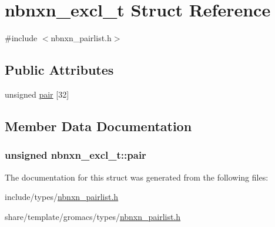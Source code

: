 \hypertarget{structnbnxn__excl__t}{\section{nbnxn\-\_\-excl\-\_\-t \-Struct \-Reference}
\label{structnbnxn__excl__t}
}


{\ttfamily \#include $<$nbnxn\-\_\-pairlist.\-h$>$}

\subsection*{\-Public \-Attributes}
\begin{DoxyCompactItemize}
\item 
unsigned \hyperlink{structnbnxn__excl__t_a95db31ff5026f9381737108281b5105e}{pair} \mbox{[}32\mbox{]}
\end{DoxyCompactItemize}


\subsection{\-Member \-Data \-Documentation}
\hypertarget{structnbnxn__excl__t_a95db31ff5026f9381737108281b5105e}{
\subsubsection[{pair}]{\setlength{\rightskip}{0pt plus 5cm}unsigned {\bf nbnxn\-\_\-excl\-\_\-t\-::pair}}}\label{structnbnxn__excl__t_a95db31ff5026f9381737108281b5105e}


\-The documentation for this struct was generated from the following files\-:\begin{DoxyCompactItemize}
\item 
include/types/\hyperlink{include_2types_2nbnxn__pairlist_8h}{nbnxn\-\_\-pairlist.\-h}\item 
share/template/gromacs/types/\hyperlink{share_2template_2gromacs_2types_2nbnxn__pairlist_8h}{nbnxn\-\_\-pairlist.\-h}\end{DoxyCompactItemize}
